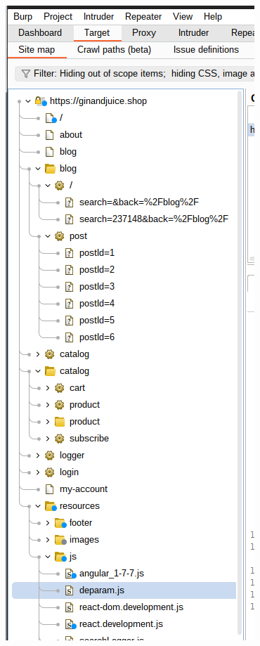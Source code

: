 \documentclass[
	a4paper, %
	12pt, %
]{CSSullivanBusinessReport}
\begin{document}
\begin{fullwidth}
\begin{itemize}
\begin{itemize}
        \end{itemize}
\end{itemize}
        \begin{figure}[H]
            \centering
            \includegraphics[width=0.5\linewidth]{Images//Mapping/after_scan.png}
            
            
        \end{figure}
\end{fullwidth}


\end{document}
